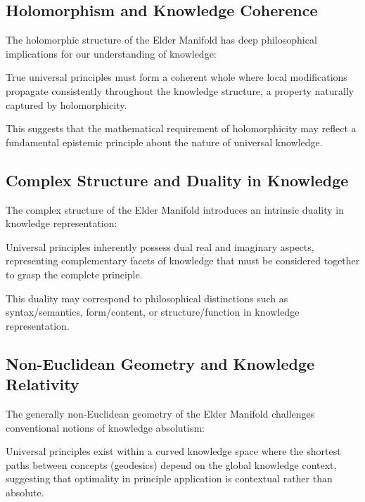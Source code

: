 \subsection{Holomorphism and Knowledge Coherence}

The holomorphic structure of the Elder Manifold has deep philosophical implications for our understanding of knowledge:

\begin{proposition}
True universal principles must form a coherent whole where local modifications propagate consistently throughout the knowledge structure, a property naturally captured by holomorphicity.
\end{proposition}

This suggests that the mathematical requirement of holomorphicity may reflect a fundamental epistemic principle about the nature of universal knowledge.

\subsection{Complex Structure and Duality in Knowledge}

The complex structure of the Elder Manifold introduces an intrinsic duality in knowledge representation:

\begin{proposition}
Universal principles inherently possess dual real and imaginary aspects, representing complementary facets of knowledge that must be considered together to grasp the complete principle.
\end{proposition}

This duality may correspond to philosophical distinctions such as syntax/semantics, form/content, or structure/function in knowledge representation.

\subsection{Non-Euclidean Geometry and Knowledge Relativity}

The generally non-Euclidean geometry of the Elder Manifold challenges conventional notions of knowledge absolutism:

\begin{proposition}
Universal principles exist within a curved knowledge space where the shortest paths between concepts (geodesics) depend on the global knowledge context, suggesting that optimality in principle application is contextual rather than absolute.
\end{proposition}

